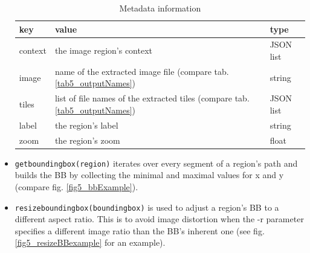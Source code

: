 \begin{itemize}
	\begin{table}[H]
		\begin{center}
			\begin{tabular}{| l | p{6cm} | l |}
				\hline
				\textbf{key} & \textbf{value} & \textbf{type}\\ \hline
				context & the image region's context & JSON list\\ \hline
				image & name of the extracted image file (compare tab. \ref{tab5_outputNames}) & string \\ \hline
				tiles & list of file names of the extracted tiles (compare tab. \ref{tab5_outputNames}) & JSON list \\ \hline
				label & the region's label & string\\ \hline
				zoom & the region's zoom & float\\ \hline
			\end{tabular}
			\caption{Metadata information}
			\label{tab5_metadataJson}
		\end{center}
	\end{table}
	
	\item \texttt{get{\textunderscore}bounding{\textunderscore}box(region)} iterates over every segment of a region's path and builds the BB by collecting the minimal and maximal values for x and y (compare fig. \ref{fig5_bbExample}).
	
	\item \texttt{resize{\textunderscore}bounding{\textunderscore}box(bounding{\textunderscore}box)} is used to adjust a region's BB to a different aspect ratio. This is to avoid image distortion when the -r parameter specifies a different image ratio than the BB's inherent one (see fig. \ref{fig5_resizeBBexample} for an example).
	

\end{itemize}
